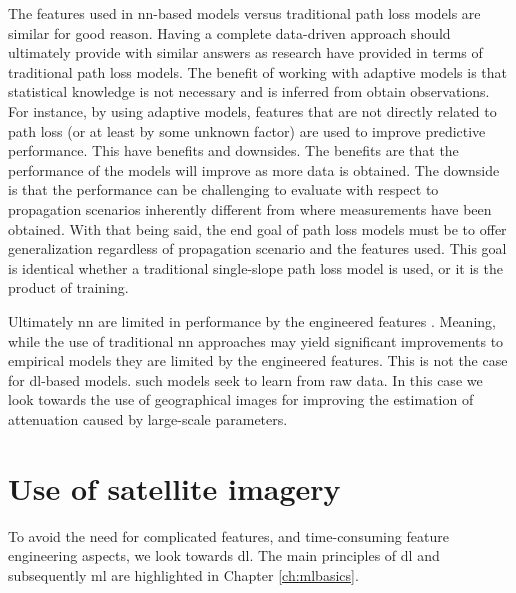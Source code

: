 The features used in \gls{nn}-based models versus traditional path loss models are similar for good reason. Having a complete data-driven approach should ultimately provide with similar answers as research have provided in terms of traditional path loss models. The benefit of working with adaptive models is that statistical knowledge is not necessary and is inferred from obtain observations. For instance, by using adaptive models, features that are not directly related to path loss (or at least by some unknown factor) are used to improve predictive performance. This have benefits and downsides. The benefits are that the performance of the models will improve as more data is obtained. The downside is that the performance can be challenging to evaluate with respect to propagation scenarios inherently different from where measurements have been obtained. With that being said, the end goal of path loss models must be to offer generalization regardless of propagation scenario and the features used. This goal is identical whether a traditional single-slope path loss model is used, or it is the product of training. 

Ultimately \gls{nn} are limited in performance by the engineered features \cite{Alom2019AArchitectures}. Meaning, while the use of traditional \gls{nn} approaches may yield significant improvements to empirical models they are limited by the engineered features. This is not the case for \gls{dl}-based models. such models seek to learn from raw data. In this case we look towards the use of geographical images for improving the estimation of attenuation caused by large-scale parameters.


\section{Use of satellite imagery}

To avoid the need for complicated features, and time-consuming feature engineering aspects, we look towards \gls{dl}. The main principles of \gls{dl} and subsequently \gls{ml} are highlighted in Chapter \ref{ch:mlbasics}. 

